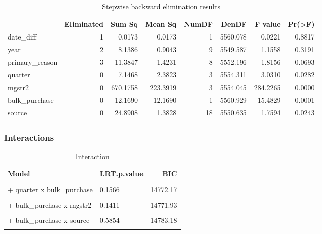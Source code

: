 \documentclass[
  11pt,
]{article}
\begin{document}
\begin{table}

\caption{\label{tab:unnamed-chunk-53}Stepwise backward elimination results}
\centering
\begin{tabular}[t]{l|r|r|r|r|r|r|r}
\hline
  & Eliminated & Sum Sq & Mean Sq & NumDF & DenDF & F value & Pr(>F)\\
\hline
date\_diff & 1 & 0.0173 & 0.0173 & 1 & 5560.078 & 0.0221 & 0.8817\\
\hline
year & 2 & 8.1386 & 0.9043 & 9 & 5549.587 & 1.1558 & 0.3191\\
\hline
primary\_reason & 3 & 11.3847 & 1.4231 & 8 & 5552.196 & 1.8156 & 0.0693\\
\hline
quarter & 0 & 7.1468 & 2.3823 & 3 & 5554.311 & 3.0310 & 0.0282\\
\hline
mgstr2 & 0 & 670.1758 & 223.3919 & 3 & 5554.045 & 284.2265 & 0.0000\\
\hline
bulk\_purchase & 0 & 12.1690 & 12.1690 & 1 & 5560.929 & 15.4829 & 0.0001\\
\hline
source & 0 & 24.8908 & 1.3828 & 18 & 5550.635 & 1.7594 & 0.0243\\
\hline
\end{tabular}
\end{table}

\hypertarget{interactions-1}{%
\subsubsection{Interactions}\label{interactions-1}}

\begin{table}[!h]

\caption{\label{tab:unnamed-chunk-54}Interaction}
\centering
\begin{tabular}[t]{l|l|r}
\hline
Model & LRT.p.value & BIC\\
\hline
\cellcolor{gray!6}{without interaction} & \cellcolor{gray!6}{} & \cellcolor{gray!6}{14751.51}\\
\hline
+ quarter x bulk\_purchase & 0.1566 & 14772.17\\
\hline
\cellcolor{gray!6}{+ quarter x mgstr2} & \cellcolor{gray!6}{0.4914} & \cellcolor{gray!6}{14820.71}\\
\hline
+ bulk\_purchase x mgstr2 & 0.1411 & 14771.93\\
\hline
\cellcolor{gray!6}{+ quarter x source} & \cellcolor{gray!6}{0.0022} & \cellcolor{gray!6}{14831.35}\\
\hline
+ bulk\_purchase x source & 0.5854 & 14783.18\\
\hline
\cellcolor{gray!6}{+ source x mgstr2} & \cellcolor{gray!6}{0.9947} & \cellcolor{gray!6}{14948.55}\\
\hline
\end{tabular}
\end{table}
\end{document}
